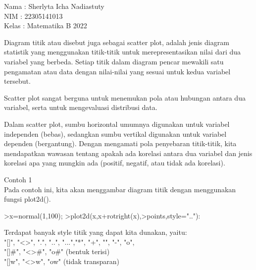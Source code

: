 \documentclass{article}
\begin{document}
\begin{eulernotebook}
\begin{eulercomment}
Nama : Sherlyta Icha Nadiastuty\\
NIM : 22305141013\\
Kelas : Matematika B 2022

\begin{eulercomment}
\begin{eulercomment}
Diagram titik atau disebut juga sebagai scatter plot, adalah jenis
diagram statistik yang menggunakan titik-titik untuk merepresentasikan
nilai dari dua variabel yang berbeda. Setiap titik dalam diagram
pencar mewakili satu pengamatan atau data dengan nilai-nilai yang
sesuai untuk kedua variabel tersebut.

Scatter plot sangat berguna untuk menemukan pola atau hubungan antara
dua variabel, serta untuk mengevaluasi distribusi data.

Dalam scatter plot, sumbu horizontal umumnya digunakan untuk variabel
independen (bebas), sedangkan sumbu vertikal digunakan untuk variabel
dependen (bergantung). Dengan mengamati pola penyebaran titik-titik,
kita mendapatkan wawasan tentang apakah ada korelasi antara dua
variabel dan jenis korelasi apa yang mungkin ada (positif, negatif,
atau tidak ada korelasi).

\end{eulercomment}
\begin{eulercomment}
Contoh 1\\
Pada contoh ini, kita akan menggambar diagram titik dengan menggunakan
fungsi plot2d().
\end{eulercomment}
\begin{eulerprompt}
>x=normal(1,100); 
>plot2d(x,x+rotright(x),>points,style=".."):
\end{eulerprompt}
\begin{eulercomment}
Terdapat banyak style titik yang dapat kita dunakan, yaitu:\\
"[]", "\textless{}\textgreater{}", ".", "..", "...","*", "+", "\textbar{}", "-", "o",\\
"[]#", "\textless{}\textgreater{}#", "o#" (bentuk terisi)\\
"[]w", "\textless{}\textgreater{}w", "ow" (tidak transparan)


\end{eulercomment}
\end{eulercomment}
\end{eulercomment}
\end{eulernotebook}
\end{document}
